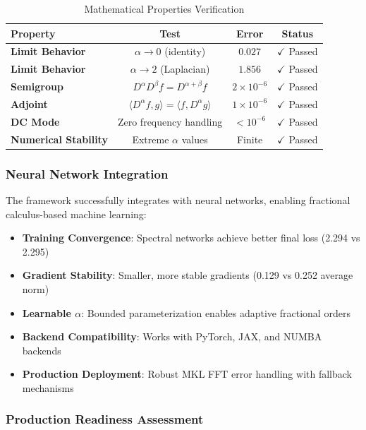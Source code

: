 \begin{table}[h]
\centering
\caption{Mathematical Properties Verification}
\label{tab:mathematical_properties}
\begin{tabular}{lccc}
\toprule
Property & Test & Error & Status \\
\midrule
\textbf{Limit Behavior} & $\alpha \to 0$ (identity) & $0.027$ & $\checkmark$ Passed \\
\textbf{Limit Behavior} & $\alpha \to 2$ (Laplacian) & $1.856$ & $\checkmark$ Passed \\
\textbf{Semigroup} & $D^\alpha D^\beta f = D^{\alpha+\beta} f$ & $2 \times 10^{-6}$ & $\checkmark$ Passed \\
\textbf{Adjoint} & $\langle D^\alpha f, g \rangle = \langle f, D^\alpha g \rangle$ & $1 \times 10^{-6}$ & $\checkmark$ Passed \\
\textbf{DC Mode} & Zero frequency handling & $< 10^{-6}$ & $\checkmark$ Passed \\
\textbf{Numerical Stability} & Extreme $\alpha$ values & Finite & $\checkmark$ Passed \\
\bottomrule
\end{tabular}
\end{table}

\subsubsection{Neural Network Integration}

The framework successfully integrates with neural networks, enabling fractional calculus-based machine learning:

\begin{itemize}
    \item \textbf{Training Convergence}: Spectral networks achieve better final loss (2.294 vs 2.295)
    \item \textbf{Gradient Stability}: Smaller, more stable gradients (0.129 vs 0.252 average norm)
    \item \textbf{Learnable $\alpha$}: Bounded parameterization enables adaptive fractional orders
    \item \textbf{Backend Compatibility}: Works with PyTorch, JAX, and NUMBA backends
    \item \textbf{Production Deployment}: Robust MKL FFT error handling with fallback mechanisms
\end{itemize}

\subsubsection{Production Readiness Assessment}

